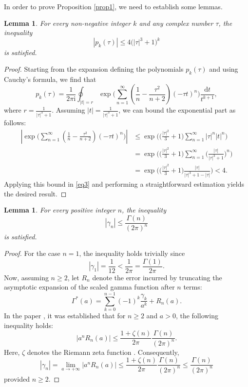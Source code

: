 \documentclass[pdftex]{sigma}
\def\im{\mathrm{i}}
\def\d{\mathrm{d}}
\numberwithin{equation}{section}
\newtheorem{Lemma}[Theorem]{Lemma}
\begin{document}
In order to prove Proposition \ref{prop1}, we need to establish some lemmas.

\begin{Lemma}\label{lemma1} For every non-negative integer $k$ and any complex number $\tau$, the inequality
\[
\left| p_k (\tau )\right| \le 4 \bigl(\left| \tau \right|^3 + 1\bigr)^k
\]
is satisfied.
\end{Lemma}

\begin{proof}
Starting from the expansion defining the polynomials $p_k(\tau)$ and using Cauchy's formula, we find that
\begin{equation}\label{eq3}
p_k (\tau ) = \frac{1}{2\pi \im}\oint_{\left| t \right| = r} \exp \bigg( \sum_{n = 1}^\infty \left( \frac{1}{n} - \frac{\tau ^2 }{n + 2} \right)( - \tau t)^n \bigg)\frac{\d t}{t^{k + 1}} ,
\end{equation}
where $r = \frac{1}{\left| \tau \right|^3 + 1}$. Assuming $\left|t\right| = \frac{1}{\left| \tau \right|^3 + 1}$, we can bound the exponential part as follows:
\begin{align*}
\left| \exp \bigg( \sum_{n = 1}^\infty \left( \frac{1}{n} - \frac{\tau ^2}{n + 2} \right)( - \tau t)^n \bigg) \right| & \le \exp \bigg( \bigg( \frac{\left| \tau \right|^2 }{3} + 1 \bigg)\sum_{n = 1}^\infty \left| \tau \right|^n \left| t \right|^n \bigg) \\ & = \exp \bigg( \bigg( \frac{\left| \tau \right|^2 }{3} + 1 \bigg)\sum_{n = 1}^\infty \bigg( \frac{\left| \tau \right|}{\left| \tau \right|^3 + 1} \bigg)^n \bigg) \\ & = \exp \bigg( \bigg( \frac{\left| \tau \right|^2 }{3} + 1 \bigg)\frac{\left| \tau \right|}{\left| \tau \right|^3 + 1 - \left| \tau \right|} \bigg) <4.
\end{align*}
Applying this bound in \eqref{eq3} and performing a straightforward estimation yields the desired result.
\end{proof}

\begin{Lemma}\label{lemma2} For every positive integer $n$, the inequality
\[
\left|\gamma_n\right| \le \frac{\Gamma(n)}{(2\pi)^n}
\]
is satisfied.
\end{Lemma}

\begin{proof} For the case $n=1$, the inequality holds trivially since
\[
\left| \gamma _1 \right| = \frac{1}{12} < \frac{1}{2\pi} = \frac{\Gamma (1)}{2\pi}.
\]
Now, assuming $n\ge 2$, let $R_n$ denote the error incurred by truncating the asymptotic expansion of the scaled gamma function after $n$ terms:
\[
\Gamma^\ast (a)=\sum_{k = 0}^{n - 1} (-1)^k \frac{\gamma _k}{a^k} + R_n (a).
\]
In the paper \cite[equation~(3.11)]{Boyd1994}, it was established that for $n\ge 2$ and $a>0$, the following inequality holds:
\[
\left| a^n R_n (a) \right| \le \frac{1 + \zeta (n)}{2\pi }\frac{\Gamma (n)}{(2\pi )^n}.
\]
Here, $\zeta$ denotes the Riemann zeta function \cite[equation~(25.2.1)]{DLMF}. Consequently,
\[
\left| \gamma_n \right| = \lim_{a \to + \infty } \left| a^n R_n (a) \right| \le \frac{1 + \zeta (n)}{2\pi }\frac{\Gamma (n)}{(2\pi )^n} \le \frac{\Gamma (n)}{(2\pi )^n}
\]
provided $n\ge 2$.
\end{proof}
\end{document}
